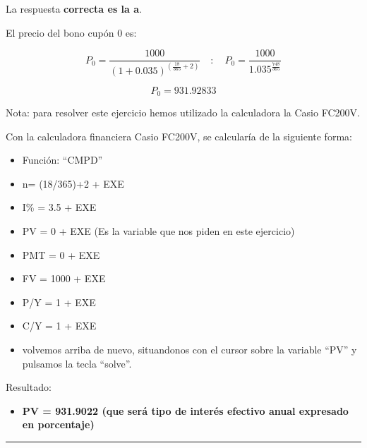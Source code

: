 \documentclass[
  letterpaper,
  DIV=11,
  numbers=noendperiod]{scrreprt}
\providecommand{\tightlist}{%
  \setlength{\itemsep}{0pt}\setlength{\parskip}{0pt}}\usepackage{longtable,booktabs,array}
\begin{document}
\begin{tcolorbox}[enhanced jigsaw, left=2mm, opacityback=0, colback=white, breakable, arc=.35mm, bottomrule=.15mm, rightrule=.15mm, toprule=.15mm, leftrule=.75mm, colframe=quarto-callout-tip-color-frame]
\begin{minipage}[t]{5.5mm}
\textcolor{quarto-callout-tip-color}{\faLightbulb}
\end{minipage}%
\begin{minipage}[t]{\textwidth - 5.5mm}

La respuesta \textbf{correcta es la a}.

El precio del bono cupón 0 es:

\[P_0=\frac{1000}{\left(1+0.035\right)^{\left(\frac{18}{365}+2\right)}}\quad :\quad P_0=\frac{1000}{1.035^{\frac{748}{365}}}\]

\[P_0=931.92833\]

Nota: para resolver este ejercicio hemos utilizado la calculadora la
Casio FC200V.

Con la calculadora financiera Casio FC200V, se calcularía de la
siguiente forma:

\begin{itemize}
\item
  Función: ``CMPD''
\item
  n= (18/365)+2 + EXE
\item
  I\% = 3.5 + EXE
\item
  PV = 0 + EXE (Es la variable que nos piden en este ejercicio)
\item
  PMT = 0 + EXE
\item
  FV = 1000 + EXE
\item
  P/Y = 1 + EXE
\item
  C/Y = 1 + EXE
\item
  volvemos arriba de nuevo, situandonos con el cursor sobre la variable
  ``PV'' y pulsamos la tecla ``solve''.
\end{itemize}

Resultado:

\begin{itemize}
\tightlist
\item
  \textbf{PV = 931.9022 (que será tipo de interés efectivo anual
  expresado en porcentaje)}
\end{itemize}

\end{minipage}%
\end{tcolorbox}

\begin{center}\rule{0.5\linewidth}{0.5pt}\end{center}
\end{document}
